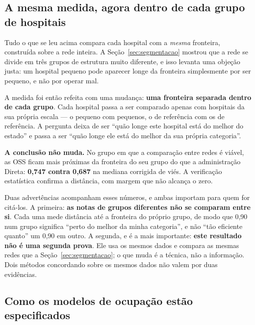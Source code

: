 \newpage
\subsection*{A mesma medida, agora dentro de cada grupo de hospitais}
\label{sub:deaestrato}

Tudo o que se leu acima compara cada hospital com a \emph{mesma} fronteira,
construída sobre a rede inteira. A Seção~\ref{sec:segmentacao} mostrou que a
rede se divide em três grupos de estrutura muito diferente, e isso levanta
uma objeção justa: um hospital pequeno pode aparecer longe da fronteira
simplesmente por ser pequeno, e não por operar mal.

A medida foi então refeita com uma mudança: \textbf{uma fronteira separada
dentro de cada grupo}. Cada hospital passa a ser comparado apenas com
hospitais da sua própria escala --- o pequeno com pequenos, o de referência
com os de referência. A pergunta deixa de ser ``quão longe este hospital
está do melhor do estado'' e passa a ser ``quão longe ele está do melhor da
sua própria categoria''.

\textbf{A conclusão não muda.} No grupo em que a comparação entre redes é
viável, as OSS ficam mais próximas da fronteira do seu grupo do que a
administração Direta: \textbf{0,747 contra 0,687} na mediana corrigida de
viés. A verificação estatística confirma a distância, com margem que não
alcança o zero.

Duas advertências acompanham esses números, e ambas importam para quem for
citá-los. A primeira: \textbf{as notas de grupos diferentes não se comparam
entre si}. Cada uma mede distância até a fronteira do próprio grupo, de modo
que 0,90 num grupo significa ``perto do melhor da minha categoria'', e não
``tão eficiente quanto'' um 0,90 em outro. A segunda, e é a mais importante:
\textbf{este resultado não é uma segunda prova}. Ele usa os mesmos dados e
compara as mesmas redes que a Seção~\ref{sec:segmentacao}; o que muda é a
técnica, não a informação. Dois métodos concordando sobre os mesmos dados
não valem por duas evidências.

\newpage
\subsection*{Como os modelos de ocupação estão especificados}
\label{sub:etapa5}

